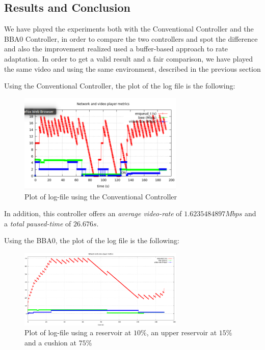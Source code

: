 \documentclass[a4paper]{report}
\begin{document}
\subsection{Results and Conclusion}

We have played the experiments both with the Conventional Controller and the BBA0 Controller, in order to compare the two controllers and spot the difference and also the improvement realized used a buffer-based approach to rate adaptation.
In order to get a valid result and a fair comparison, we have played the same video and using the same environment, described in the previous section

Using the Conventional Controller, the plot of the log file is the following:

\begin{figure}[H]
  \begin{center}
    \includegraphics[width=0.7\textwidth]{conventionalcontroller}
  \end{center}
  \caption{Plot of log-file using the Conventional Controller}\label{resten}
\end{figure}

In addition, this controller offers an \textit{average video-rate} of $1.6235484897 Mbps$ and a \textit{total paused-time} of $26.676 s$.


Using the BBA0, the plot of the log file is the following:

\begin{figure}[H]
  \begin{center}
    \includegraphics[width=0.7\textwidth]{res_ten_cushion_seventyfive}
  \end{center}
  \caption{Plot of log-file using a reservoir at $10\%$, an upper reservoir at $15\%$ and a cushion at $75\%$}\label{resten}
\end{figure}
\end{document}
